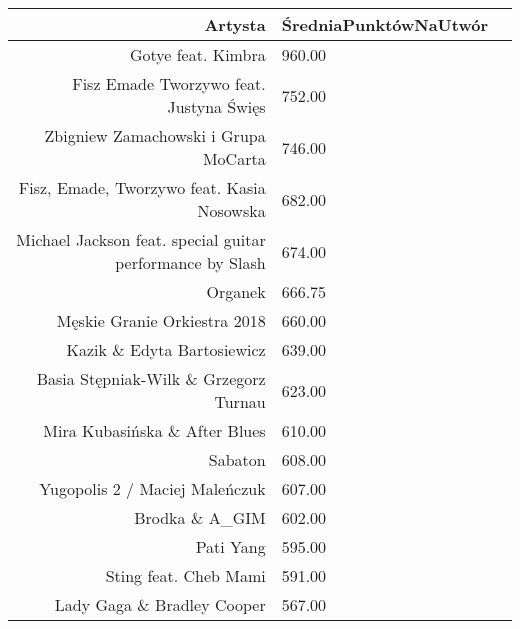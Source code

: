 \documentclass[11pt]{article}
\begin{document}
    \begin{tabular}{r|ll}
 Artysta & ŚredniaPunktówNaUtwór\\
\hline
	 Gotye feat. Kimbra                                        & 960.00                                                   \\
	 Fisz Emade Tworzywo feat. Justyna Święs                   & 752.00                                                   \\
	 Zbigniew Zamachowski i Grupa MoCarta                      & 746.00                                                   \\
	 Fisz, Emade, Tworzywo feat. Kasia Nosowska                & 682.00                                                   \\
	 Michael Jackson feat. special guitar performance by Slash & 674.00                                                   \\
	 Organek                                                   & 666.75                                                   \\
	 Męskie Granie Orkiestra 2018                              & 660.00                                                   \\
	 Kazik \& Edyta Bartosiewicz                                & 639.00                                                     \\
	 Basia Stępniak-Wilk \& Grzegorz Turnau                     & 623.00                                                     \\
	 Mira Kubasińska \& After Blues                             & 610.00                                                     \\
	 Sabaton                                                   & 608.00                                                   \\
	 Yugopolis 2 / Maciej Maleńczuk                            & 607.00                                                   \\
	 Brodka \& A\_GIM                                            & 602.00                                                       \\
	 Pati Yang                                                 & 595.00                                                   \\
	 Sting feat. Cheb Mami                                     & 591.00                                                   \\
	 Lady Gaga \& Bradley Cooper                                & 567.00                                                     \\

\end{tabular}
\end{document}
